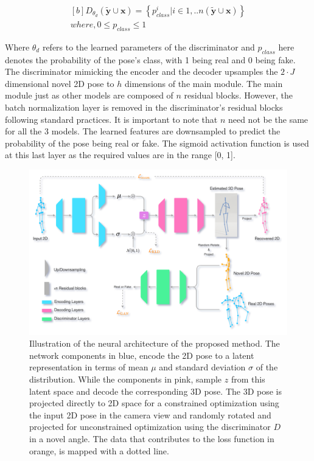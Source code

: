 \begin{equation} \label{eqn:proj_rotated}
    \begin{gathered}[b]
        D_{\theta_d}(\tilde{\textbf{y}} \cup \textbf{x}) = \left\lbrace p_{class}^i | i \in {1, .. n(\tilde{\textbf{y}} \cup \textbf{x})}\right\rbrace \\
        where, 0\leq p_{class} \leq 1
    \end{gathered}
\end{equation}

Where $\theta_d$ refers to the learned parameters of the discriminator and $p_{class}$ here denotes the probability of the pose's class, with 1 being real and 0 being fake. The discriminator mimicking the encoder and the decoder upsamples the $2\!\cdot\!J$ dimensional novel 2D pose to $h$ dimensions of the main module. The main module just as other models are composed of $n$ residual blocks. However, the batch normalization layer is removed in the discriminator's residual blocks following standard practices. It is important to note that $n$ need not be the same for all the 3 models. The learned features are downsampled to predict the probability of the pose being real or fake. The sigmoid activation function is used at this last layer as the required values are in the range [0, 1]. %

\begin{figure}[h] 
    \centering
    \includegraphics[width=\textwidth]{figures/arch/method_arch.png}
    \caption{Illustration of the neural architecture of the proposed method. The network components in blue, encode the 2D pose to a latent representation in terms of mean $\mu$ and standard deviation $\sigma$ of the distribution. While the components in pink, sample $z$ from this latent space and decode the corresponding 3D pose. The 3D pose is projected directly to 2D space for a constrained optimization using the input 2D pose in the camera view and randomly rotated and projected for unconstrained optimization using the discriminator $D$ in a novel angle. The data that contributes to the loss function in orange, is mapped with a dotted line.
    }
    \label{fig:method_arch}
\end{figure}

